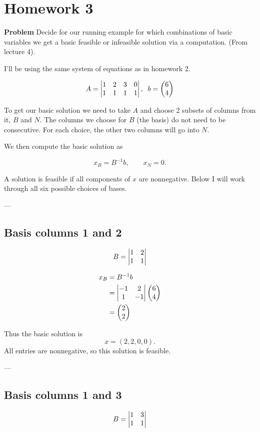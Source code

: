 \section*{Homework 3}

\textbf{Problem} Decide for our running example for which combinations of basic variables we get a basic feasible or infeasible solution via a computation. (From lecture 4).

I'll be using the same system of equations as in homework 2.

\[
	A = \m{v}{1&2&3&0 \\ 1&1&1&1}, \;\; b = \m{p}{6\\4}
\]

To get our basic solution we need to take $A$ and choose 2 subsets of columns from it, $B$ and $N$. The columns we choose for $B$ (the basis) do not need to be consecutive. For each choice, the other two columns will go into $N$.  

We then compute the basic solution as

\[
	x_B = B^{-1}b, \qquad x_N = 0.
\]

A solution is feasible if all components of $x$ are nonnegative. Below I will work through all six possible choices of bases.

---

\subsection*{Basis columns 1 and 2}

\[
	B = \m{v}{1&2\\1&1}
\]

\begin{align*}
	x_B &= B^{-1}b \\
	&= \m{v}{-1&2\\1&-1} \m{p}{6\\4} \\
	&= \m{p}{2\\2}
\end{align*}

Thus the basic solution is
\[
	x = (2, 2, 0, 0).
\]
All entries are nonnegative, so this solution is feasible.

---

\subsection*{Basis columns 1 and 3}

\[
	B = \m{v}{1&3\\1&1}
\]

